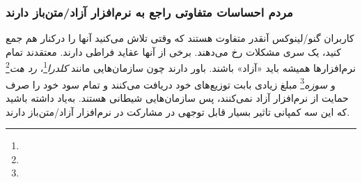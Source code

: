 \subsubsection{مردم احساسات متفاوتی راجع به نرم‌افزار آزاد/متن‌باز دارند}
کاربران گنو/لینوکس آنقدر متفاوت هستند که وقتی تلاش می‌کنید آنها را درکنار هم جمع کنید، یک سری
مشکلات رخ می‌دهند. برخی از آنها عقاید فراطی دارند. معتقدند تمام نرم‌افزارها همیشه باید «آزاد» باشند.
باور دارند چون سازمان‌هایی مانند
\emph{کلدرا}\footnote{}، \emph{رد هت}\footnote{} و \emph{سوزه}\footnote{}
مبلغ زیادی بابت توزیع‌های خود دریافت می‌کنند و تمام سود خود را صرف حمایت از نرم‌افزار آزاد نمی‌کنند،
پس سازمان‌هایی شیطانی هستند.
به‌یاد داشته باشید که این سه کمپانی تاثیر بسیار قابل توجهی در مشارکت در نرم‌افزار آزاد/متن‌باز دارند.

